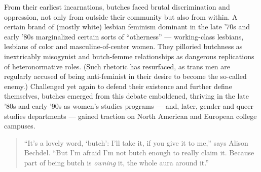 From their earliest incarnations, butches faced brutal discrimination
and oppression, not only from outside their community but also from
within. A certain brand of (mostly white) lesbian feminism dominant in
the late '70s and early '80s marginalized certain sorts of ``otherness''
--- working-class lesbians, lesbians of color and masculine-of-center
women. They pilloried butchness as inextricably misogynist and
butch-femme relationships as dangerous replications of heteronormative
roles. (Such rhetoric has resurfaced, as trans men are regularly accused
of being anti-feminist in their desire to become the so-called enemy.)
Challenged yet again to defend their existence and further define
themselves, butches emerged from this debate emboldened, thriving in the
late '80s and early '90s as women's studies programs --- and, later,
gender and queer studies departments --- gained traction on North
American and European college campuses.

\begin{quote}
``It's a lovely word, `butch': I'll take it, if you give it to me,''
says Alison Bechdel. ``But I'm afraid I'm not butch enough to really
claim it. Because part of being butch is \emph{owning} it, the whole
aura around it.''
\end{quote}

